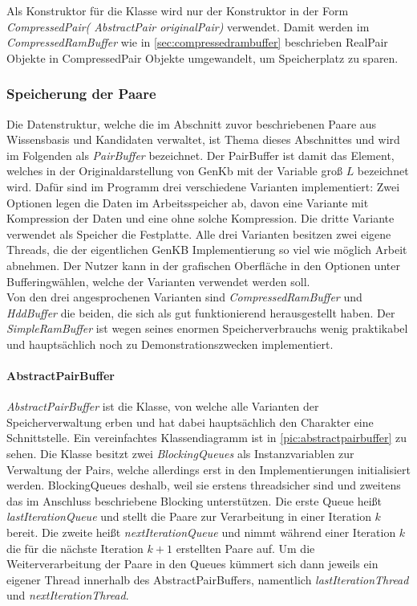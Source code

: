 \documentclass[12pt,a4paper]{article}
\begin{document}
Als Konstruktor für die Klasse wird nur der Konstruktor in der Form \textit{CompressedPair( AbstractPair originalPair)} verwendet. Damit werden im \textit{CompressedRamBuffer} wie in \autoref{sec:compressedrambuffer} beschrieben RealPair Objekte in CompressedPair Objekte umgewandelt, um Speicherplatz zu sparen.


\subsubsection{Speicherung der Paare}
\label{sec:pairbuffer}


Die Datenstruktur, welche die im Abschnitt zuvor beschriebenen Paare aus Wissensbasis und Kandidaten verwaltet, ist Thema dieses Abschnittes und wird im Folgenden als  \textit{PairBuffer} bezeichnet. Der PairBuffer ist damit das Element, welches in der Originaldarstellung von GenKb mit der Variable groß $L$ bezeichnet wird. Dafür sind im Programm drei verschiedene Varianten implementiert: Zwei Optionen legen die Daten im Arbeitsspeicher ab, davon eine Variante mit Kompression der Daten und eine ohne solche Kompression. Die dritte Variante verwendet als Speicher die Festplatte. Alle drei Varianten besitzen zwei eigene Threads, die der eigentlichen GenKB Implementierung so viel wie möglich Arbeit abnehmen. Der Nutzer kann in der grafischen Oberfläche in den Optionen unter \glqq Buffering\grqq \space wählen, welche der Varianten verwendet werden soll. \\
Von den drei angesprochenen Varianten  sind \textit{CompressedRamBuffer} und \textit{HddBuffer} die beiden, die sich als gut funktionierend herausgestellt haben. Der \textit{SimpleRamBuffer} ist wegen seines enormen Speicherverbrauchs wenig praktikabel und hauptsächlich noch zu Demonstrationszwecken implementiert.

\paragraph{AbstractPairBuffer}\mbox{}
\label{sec:abstractbuffer}



\textit{AbstractPairBuffer} ist die Klasse, von welche alle Varianten der Speicherverwaltung erben und hat dabei hauptsächlich den Charakter eine Schnittstelle. Ein vereinfachtes Klassendiagramm ist in \autoref{pic:abstractpairbuffer} zu sehen. Die Klasse besitzt zwei \textit{BlockingQueues} als Instanzvariablen zur Verwaltung der Pairs, welche allerdings erst in den Implementierungen initialisiert werden.  BlockingQueues deshalb, weil sie erstens threadsicher sind und zweitens das im Anschluss beschriebene Blocking unterstützen. Die erste Queue heißt \textit{lastIterationQueue} und stellt die Paare zur Verarbeitung in einer Iteration $k$ bereit. Die zweite heißt \textit{nextIterationQueue} und nimmt während einer Iteration $k$ die für die nächste Iteration $k+1$ erstellten Paare auf. Um die Weiterverarbeitung der Paare in den Queues kümmert sich dann jeweils ein eigener Thread innerhalb des AbstractPairBuffers, namentlich \textit{lastIterationThread} und \textit{nextIterationThread}. 
\end{document}
